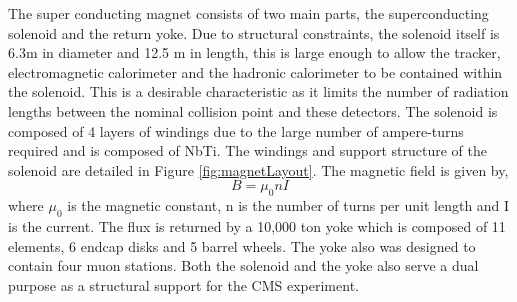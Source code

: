 The super conducting magnet consists of two main parts, the superconducting
solenoid and the return yoke.
Due to structural constraints, the solenoid itself is 6.3m in diameter and 12.5 m in length,
this is large enough to allow the tracker, electromagnetic calorimeter
and the hadronic calorimeter to be contained within the solenoid. This is
a desirable characteristic as it limits the number of radiation
lengths between the nominal collision point and these detectors. The solenoid
is composed of 4 layers of windings due to the large number of ampere-turns required
and is composed of NbTi. The windings and support structure of the solenoid
are detailed in Figure \ref{fig:magnetLayout}. 
The magnetic field is given by,
\begin{displaymath}
B=\mu_{0}nI
\end{displaymath}
where $\mu_{0}$ is the magnetic constant, n is the number of turns per unit length and 
I is the current. 
The flux is returned by a 10,000 ton yoke which is composed of 11 elements, 6 endcap disks 
and 5 barrel wheels. The yoke also was designed to contain four muon stations. 
Both the solenoid and the yoke also serve a dual purpose as a structural support 
for the CMS experiment. 